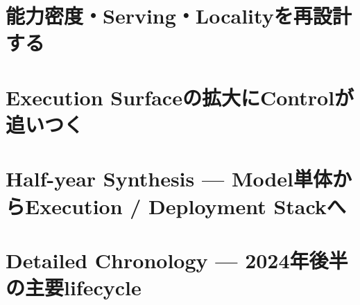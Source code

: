 \documentclass[lualatex,a4paper,11pt]{jlreq}
\begin{document}
\Needspace{0.45\textheight}
\bigskip
\section{能力密度・Serving・Localityを再設計する}
\label{pkg:efficiency-serving}
\vspace{0.15em}

\vspace{0.20em}
\begin{multicols}{2}

\end{multicols}

\medskip


\Needspace{0.45\textheight}
\bigskip
\section{Execution Surfaceの拡大にControlが追いつく}
\label{pkg:control-evaluation}
\vspace{0.15em}

\vspace{0.20em}
\begin{multicols}{2}

\end{multicols}

\medskip


\Needspace{0.35\textheight}
\bigskip


\Needspace{0.45\textheight}
\bigskip
\section{Half-year Synthesis — Model単体からExecution / Deployment Stackへ}
\label{pkg:synthesis}
\vspace{0.15em}

\vspace{0.20em}
\begin{multicols}{2}

\end{multicols}


\Needspace{0.45\textheight}
\bigskip
\section{Detailed Chronology — 2024年後半の主要lifecycle}
\label{pkg:chronology}
\vspace{0.15em}

\vspace{0.20em}
\begin{multicols}{2}

\end{multicols}


\Needspace{0.30\textheight}
\bigskip
{}\par
\smallskip
\printbibliography[title={References / Source Notes}]
\end{document}
